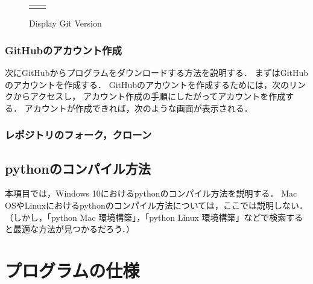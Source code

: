 \begin{figure}[h]
\begin{tabular}{cc}
\begin{minipage}{.5\textwidth}
          \caption{Display Git Version}
          \label{fig:git_version} %
      \end{minipage}
  \end{tabular}
\end{figure}

\subsubsection{GitHubのアカウント作成}
次にGitHubからプログラムをダウンロードする方法を説明する．
まずはGitHubのアカウントを作成する．
GitHubのアカウントを作成するためには，次のリンクからアクセスし，
アカウント作成の手順にしたがってアカウントを作成する．
アカウントが作成できれば，次のような画面が表示される．


\subsubsection{レポジトリのフォーク，クローン}

\subsection{pythonのコンパイル方法}
本項目では，Windows 10におけるpythonのコンパイル方法を説明する．
Mac OSやLinuxにおけるpythonのコンパイル方法については，ここでは説明しない．
（しかし，「python Mac 環境構築」，「python Linux 環境構築」などで検索すると最適な方法が見つかるだろう．）

\section{プログラムの仕様}

